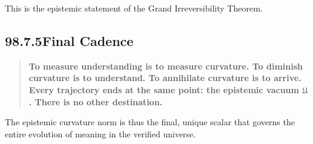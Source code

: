 This is the epistemic statement of the Grand Irreversibility Theorem.

\subsection*{98.7.5\quad Final Cadence}

\begin{quote}
\textbf{
To measure understanding is to measure curvature.  
To diminish curvature is to understand.  
To annihilate curvature is to arrive.  
Every trajectory ends at the same point: the epistemic vacuum $\mathfrak{U}$.  
There is no other destination.
}
\end{quote}

The epistemic curvature norm is thus the final,
unique scalar that governs the entire evolution of meaning
in the verified universe.
